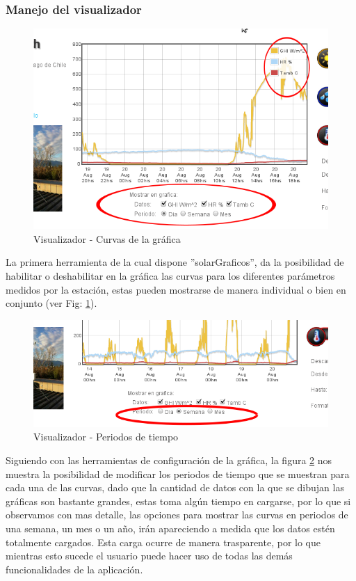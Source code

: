 \subsubsection{Manejo del visualizador}
\begin{figure}[ht]
        \centering
        \includegraphics[scale=0.4]{./images/cap5chap1img1}
        \caption{Visualizador - Curvas de la gráfica}
        \label{visualizador}
\end{figure}
La primera herramienta de la cual dispone ''solarGraficos'', da la posibilidad de habilitar o deshabilitar en la gráfica las curvas para los diferentes parámetros medidos por la estación, estas pueden mostrarse de manera individual o bien en conjunto (ver Fig: \ref{visualizador}).

\begin{figure}[ht]
        \centering
        \includegraphics[scale=0.4]{./images/cap5chap1img3}
        \caption{Visualizador - Periodos de tiempo}
        \label{visualizadorTiempo}
\end{figure}
Siguiendo con las herramientas de configuración de la gráfica, la figura \ref{visualizadorTiempo} nos muestra la posibilidad de modificar los periodos de tiempo que se muestran para cada una de las curvas, dado que la cantidad de datos con la que se dibujan las gráficas son bastante grandes, estas toma algún tiempo en cargarse, por lo que si observamos con mas detalle, las opciones para mostrar las curvas en periodos de una semana, un mes o un año, irán apareciendo a medida que los datos estén totalmente cargados. Esta carga ocurre de manera trasparente, por lo que mientras esto sucede el usuario puede hacer uso de todas las demás funcionalidades de la aplicación.\\

